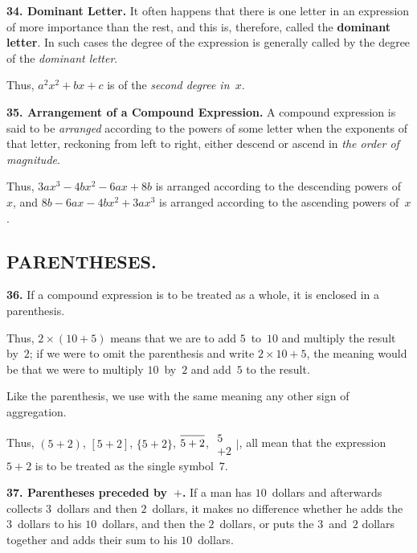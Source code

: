 \documentclass[12pt]{book}[2005/09/16]
\newcommand{\Section}[1]{\subsection*{\centering\normalfont\small\scshape #1}}
\newcommand{\Paragraph}[1]{\medskip\par\textbf{#1}}
\newcommand{\Defn}[1]{\textbf{#1}}
\newenvironment{Remark}[1][]{\par\small\textsc{#1}}{\par}
\newcommand{\VSum}[2]{\begin{array}{r}#1\\[-4pt]+#2\end{array}\Big|}
\newcommand{\Vinc}[1]{\overline{#1\strut}}
\begin{document}
\Paragraph{34.  Dominant Letter.}  It often happens that there is one
letter in an expression of more importance than the rest,
and this is, therefore, called the \Defn{dominant letter}.  In such
cases the degree of the expression is generally called by
the degree of the \emph{dominant letter}.

\begin{Remark}
Thus, $a^{2}x^{2} + bx + c$ is of the \emph{second degree in~$x$}.
\end{Remark}

\Paragraph{35.  Arrangement of a Compound Expression.}  A compound
expression is said to be \emph{arranged} according to the powers
of some letter when the exponents of that letter, reckoning
from left to right, either descend or ascend in \emph{the order of
magnitude}.

\begin{Remark}
Thus, $3ax^{3} - 4bx^{2} - 6ax + 8b$ is arranged according to the descending
powers of~$x$, and $8b - 6ax - 4bx^{2} + 3ax^{3}$ is arranged
according to the ascending powers of~$x$.
\end{Remark}


\Section{PARENTHESES.}

\Paragraph{36.}  If a compound expression is to be treated as a whole,
it is enclosed in a parenthesis.

\begin{Remark}
Thus, $2 × (10 + 5)$ means that we are to add $5$~to~$10$ and multiply
the result by~$2$; if we were to omit the parenthesis and write
$2 × 10 + 5$, the meaning would be that we were to multiply $10$~by~$2$
and add~$5$ to the result.
\end{Remark}

Like the parenthesis, we use with the same meaning any
other sign of aggregation.

\begin{Remark}
Thus, $(5 + 2)$, $[5 + 2]$, $\{5 + 2\}$, $\Vinc{5 + 2}$, $\VSum{5}{2}$, all mean that the
expression $5 + 2$ is to be treated as the single symbol~$7$.
\end{Remark}

\Paragraph{37.  Parentheses preceded by~$+$.} If a man has $10$~dollars
and afterwards collects $3$~dollars and then $2$~dollars, it
makes no difference whether he adds the $3$~dollars to his
$10$~dollars, and then the $2$~dollars, or puts the $3$~and~$2$
dollars together and adds their sum to his $10$~dollars.
\end{document}
